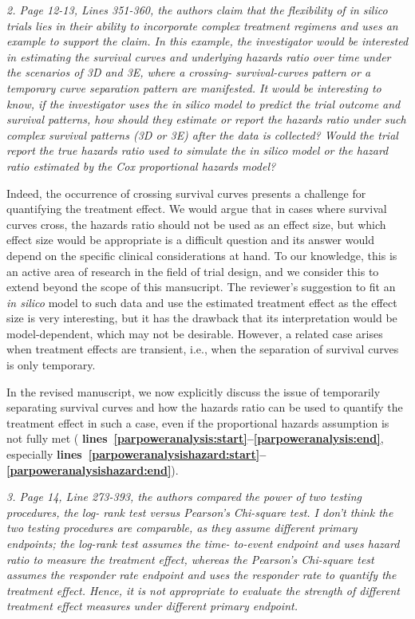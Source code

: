 \documentclass{article}
\newcommand{\revr}[1]{{\color{gray} \itshape #1}}
\newcommand{\auth}[1]{{#1}}
\newcommand{\chng}[1]{{\color{blue!70!black} #1}}
\newcommand{\lr}[1]{{\bfseries\color{red!70!black} lines~\ref{#1:start}--\ref{#1:end}}}
\begin{document}
\revr{
2. Page 12-13, Lines 351-360, the authors claim that the flexibility of in silico trials lies in their ability to incorporate complex treatment regimens and uses an example to support the claim. In this example, the investigator would be interested in estimating the survival curves and underlying hazards ratio over time under the scenarios of 3D and 3E, where a crossing- survival-curves pattern or a temporary curve separation pattern are manifested. It would be interesting to know, if the investigator uses the in silico model to predict the trial outcome and survival patterns, how should they estimate or report the hazards ratio under such
complex survival patterns (3D or 3E) after the data is collected? Would the trial report the true hazards ratio used to simulate the in silico model or the hazard ratio estimated by the Cox proportional hazards model?
}

\auth{
Indeed, the occurrence of crossing survival curves presents a challenge for quantifying the treatment effect. We would argue that in cases where survival curves cross, the hazards ratio should not be used as an effect size, but which effect size would be appropriate is a difficult question and its answer would depend on the specific clinical considerations at hand. To our knowledge, this is an active area of research in the field of trial design, and we consider this to extend beyond the scope of this mansucript. The reviewer's suggestion to fit an \emph{in silico} model to such data and use the estimated treatment effect as the effect size is very interesting, but it has the drawback that its interpretation would be model-dependent, which may not be desirable. However, a related case arises when treatment effects are transient, i.e., when the separation of survival curves is only temporary.
}

\chng{In the revised manuscript, we now explicitly discuss the issue of temporarily separating survival curves and how the hazards ratio can be used to quantify the treatment effect in such a case, even if the proportional hazards assumption is not fully met (\lr{parpoweranalysis}, especially \lr{parpoweranalysishazard}).}

\revr{
3. Page 14, Line 273-393, the authors compared the power of two testing procedures, the log- rank test versus Pearson’s Chi-square test. I don’t think the two testing procedures are comparable, as they assume different primary endpoints; the log-rank test assumes the time- to-event endpoint and uses hazard ratio to measure the treatment effect, whereas the Pearson’s Chi-square test assumes the responder rate endpoint and uses the responder rate to quantify the treatment effect. Hence, it is not appropriate to evaluate the strength of different treatment effect measures under different primary endpoint.
}
\end{document}
